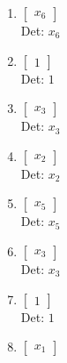 \documentclass[12pt]{article}
\begin{document}
\begin{enumerate}
\begin{enumerate}
\begin{enumerate}
\item $\displaystyle \left[\begin{matrix}x_{6}\end{matrix}\right]$\\

Det: $x_{6}$\\


\item $\displaystyle \left[\begin{matrix}1\end{matrix}\right]$\\

Det: $1$\\


\item $\displaystyle \left[\begin{matrix}x_{3}\end{matrix}\right]$\\

Det: $x_{3}$\\


\item $\displaystyle \left[\begin{matrix}x_{2}\end{matrix}\right]$\\

Det: $x_{2}$\\


\item $\displaystyle \left[\begin{matrix}x_{5}\end{matrix}\right]$\\

Det: $x_{5}$\\


\item $\displaystyle \left[\begin{matrix}x_{3}\end{matrix}\right]$\\

Det: $x_{3}$\\


\item $\displaystyle \left[\begin{matrix}1\end{matrix}\right]$\\

Det: $1$\\


\item $\displaystyle \left[\begin{matrix}x_{1}\end{matrix}\right]$\\


\end{enumerate}
\end{enumerate}
\end{enumerate}
\end{document}
